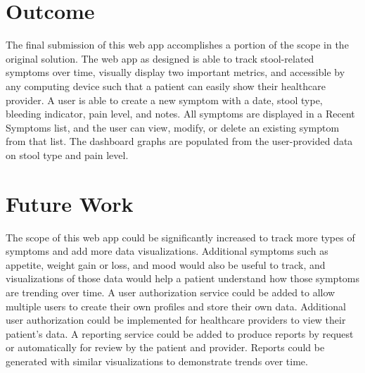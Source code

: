 \documentclass[letterpaper]{jdf}
\begin{document}
\section{Outcome}
The final submission of this web app accomplishes a portion of the scope in the original solution.
The web app as designed is able to track stool-related symptoms over time, visually display two important metrics,
and accessible by any computing device such that a patient can easily show their healthcare provider.
A user is able to create a new symptom with a date, stool type, bleeding indicator, pain level, and notes.
All symptoms are displayed in a Recent Symptoms list, and the user can view, modify, or delete an existing symptom from that list.
The dashboard graphs are populated from the user-provided data on stool type and pain level.

\section{Future Work}
The scope of this web app could be significantly increased to track more types of symptoms and add more data visualizations.
Additional symptoms such as appetite, weight gain or loss, and mood would also be useful to track, and visualizations of 
those data would help a patient understand how those symptoms are trending over time.
A user authorization service could be added to allow multiple users to create their own profiles and store their own data.
Additional user authorization could be implemented for healthcare providers to view their patient's data.
A reporting service could be added to produce reports by request or automatically for review by the patient and provider.
Reports could be generated with similar visualizations to demonstrate trends over time.
\end{document}

